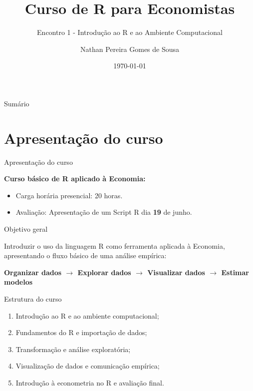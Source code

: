 \documentclass[11pt]{beamer}
\author{Nathan Pereira Gomes de Sousa}
\title{Curso de R para Economistas}
\subtitle{Encontro 1 - Introdução ao R e ao Ambiente Computacional}
\institute{gECo lab \\ UAEF-UFCG}
\date{\today}
\begin{document}
	
	\begin{frame}
		\titlepage
	\end{frame}
	
	\begin{frame}{Sumário}
		\centering
		\tableofcontents
	\end{frame}
	
	\section{Apresentação do curso}
	
	\begin{frame}{Apresentação do curso}
		
		\textbf{Curso básico de R aplicado à Economia:}
		\begin{itemize}
			\item Carga horária presencial: 20 horas.
			\item Avaliação: Apresentação de um Script R dia \textbf{19} de junho.
		\end{itemize}
		
	\end{frame}
	
	\begin{frame}{Objetivo geral}
		
		Introduzir o uso da linguagem R como ferramenta aplicada à Economia, apresentando o fluxo básico de uma análise empírica:
		
		\vspace{0.5cm}
		
		\begin{center}
			\textbf{Organizar dados $\rightarrow$ Explorar dados $\rightarrow$ Visualizar dados $\rightarrow$ Estimar modelos}
		\end{center}
		
	\end{frame}
	
	\begin{frame}{Estrutura do curso}
		
		\begin{enumerate}
			\item Introdução ao R e ao ambiente computacional;
			\item Fundamentos do R e importação de dados;
			\item Transformação e análise exploratória;
			\item Visualização de dados e comunicação empírica;
			\item Introdução à econometria no R e avaliação final.
		\end{enumerate}
		
	\end{frame}
	
\end{document}
